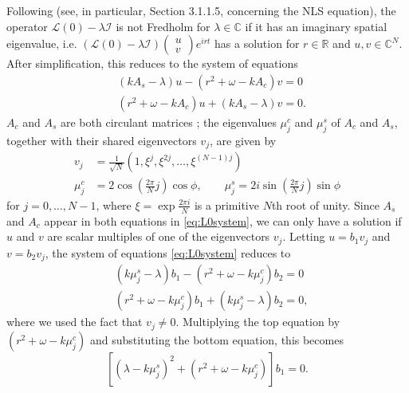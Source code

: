 \documentclass[11pt,reqno]{amsart}
\def\R{{\mathbb R}}
\def\C{{\mathbb C}}
\def\calI{{\mathcal I}}
\def\calL{{\mathcal L}}
\begin{document}
Following \cite[Section 3.1]{Kapitula2013} (see, in particular, Section 3.1.1.5, concerning the NLS equation), the operator $\calL(0) - \lambda \calI$ is not Fredholm for $\lambda \in \C$ if it has an imaginary spatial eigenvalue, i.e. 
$\left(\calL(0)-\lambda \calI \right) \begin{pmatrix}u\\v\end{pmatrix} e^{i r t}$
has a solution for $r \in \R$ and $u, v \in \C^N$. After simplification, this reduces to the system of equations 
\begin{equation}\label{eq:L0system}
\begin{aligned}
&(k A_s - \lambda)u - (r^2 + \omega - k A_c) v = 0 \\
&(r^2 + \omega - k A_c)u + (k A_s - \lambda) v = 0.
\end{aligned}
\end{equation}
$A_c$ and $A_s$ are both circulant matrices \cite{davis2012circulant}; the eigenvalues $\mu_j^c$ and $\mu_j^s$ of $A_c$ and $A_s$, together with their shared eigenvectors $v_j$, are given by
\begin{equation}\label{eq:circeigs}
\begin{aligned}
v_j &= \frac{1}{\sqrt{N}}\left(1, \xi^j, \xi^{2j}, \dots, \xi^{(N-1)j} \right) \\
\mu_j^c &= 2 \cos\left( \frac{2 \pi}{N} j\right) \cos \phi, \qquad 
\mu_j^s = 2 i \sin\left( \frac{2 \pi}{N} j\right) \sin \phi
\end{aligned}
\end{equation}
for $j = 0, \dots, N-1$, where $\xi = \exp{\frac{2\pi i}{N}}$ is a primitive $N$th root of unity. Since $A_s$ and $A_c$ appear in both equations in \cref{eq:L0system}, we can only have a solution if $u$ and $v$ are scalar multiples of one of the eigenvectors $v_j$. Letting $u = b_1 v_j$ and $v = b_2 v_j$, the system of equations \cref{eq:L0system} reduces to 
\begin{equation}\label{eq:L0system2}
\begin{aligned}
&(k \mu_j^s - \lambda) b_1 - (r^2 + \omega - k \mu_j^c) b_2 = 0 \\
&(r^2 + \omega - k \mu_j^c) b_1 + (k \mu_j^s - \lambda) b_2 = 0,
\end{aligned}
\end{equation}
where we used the fact that $v_j \neq 0$. Multiplying the top equation by $(r^2 + \omega - k \mu_j^c)$ and substituting the bottom equation, this becomes
\begin{equation*}
\left[ (\lambda - k \mu_j^s)^2  + (r^2 + \omega - k \mu_j^c) \right] b_1 = 0.
\end{equation*}
\end{document}
